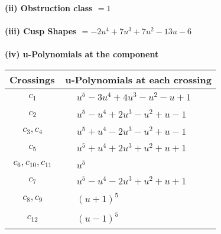 \documentclass[1p]{elsarticle_modified}
\theoremstyle{definition}
\begin{document}
\flushleft \textbf{(ii) Obstruction class $= 1$}\\~\\
\flushleft \textbf{(iii) Cusp Shapes $= -2 u^4+7 u^3+7 u^2-13 u-6$}\\~\\
\newpage\renewcommand{\arraystretch}{1}
\flushleft \textbf{(iv) u-Polynomials at the component}\newline \\
\begin{tabular}{m{50pt}|m{274pt}}
Crossings & \hspace{64pt}u-Polynomials at each crossing \\
\hline $$\begin{aligned}c_{1}\end{aligned}$$&$\begin{aligned}
&u^5-3 u^4+4 u^3- u^2- u+1
\end{aligned}$\\
\hline $$\begin{aligned}c_{2}\end{aligned}$$&$\begin{aligned}
&u^5- u^4+2 u^3- u^2+u-1
\end{aligned}$\\
\hline $$\begin{aligned}c_{3},c_{4}\end{aligned}$$&$\begin{aligned}
&u^5+u^4-2 u^3- u^2+u-1
\end{aligned}$\\
\hline $$\begin{aligned}c_{5}\end{aligned}$$&$\begin{aligned}
&u^5+u^4+2 u^3+u^2+u+1
\end{aligned}$\\
\hline $$\begin{aligned}c_{6},c_{10},c_{11}\end{aligned}$$&$\begin{aligned}
&u^5
\end{aligned}$\\
\hline $$\begin{aligned}c_{7}\end{aligned}$$&$\begin{aligned}
&u^5- u^4-2 u^3+u^2+u+1
\end{aligned}$\\
\hline $$\begin{aligned}c_{8},c_{9}\end{aligned}$$&$\begin{aligned}
&(u+1)^5
\end{aligned}$\\
\hline $$\begin{aligned}c_{12}\end{aligned}$$&$\begin{aligned}
&(u-1)^5
\end{aligned}$\\
\hline
\end{tabular}\\~\\
\end{document}
